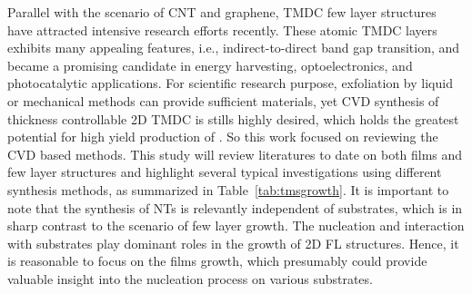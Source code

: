Parallel with the scenario of CNT and graphene, TMDC few layer structures have attracted intensive research efforts recently. These atomic TMDC layers exhibits many appealing features, i.e., indirect-to-direct band gap transition,\cite{Splendiani2010} and became a promising candidate in energy harvesting, optoelectronics, and photocatalytic applications. For scientific research purpose, exfoliation by liquid\cite{Smith2011} or mechanical methods\cite{Lee2010a} can provide sufficient materials, yet CVD synthesis of thickness controllable 2D TMDC is stills highly desired, which holds the greatest potential for high yield production of . So this work focused on reviewing the CVD based methods. This study will review literatures to date on both  films and few layer structures and highlight several typical investigations using different synthesis methods, as summarized in Table~\ref{tab:tmsgrowth}. It is important to note that the synthesis of NTs is relevantly independent of substrates, which is in sharp contrast to the scenario of few layer growth. The  nucleation and interaction with substrates play dominant roles in the growth of 2D FL structures. Hence, it is reasonable to focus on the  films growth, which presumably could provide valuable insight into the nucleation process on various substrates.

